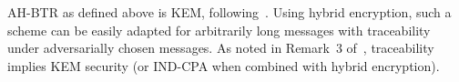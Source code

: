 \noindent
AH-BTR as defined above is KEM, following~\cite{C:Zhandry20}.
Using hybrid encryption,
such a scheme can be easily adapted for arbitrarily long messages
with traceability under adversarially chosen messages.
As noted in Remark~3 of~\cite{EPRINT:Zhandry20a},
traceability implies KEM security
(or IND-CPA when combined with hybrid encryption).


